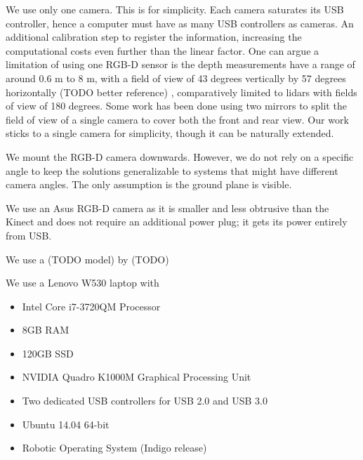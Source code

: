 We use only one camera. This is for simplicity. Each camera saturates its USB
controller, hence a computer must have as many USB controllers as cameras.
An additional calibration step to register the information, increasing the
computational costs even further than the linear factor. 
One can argue a limitation of using one RGB-D sensor is the depth measurements
have a range of around 0.6 m to 8 m, with a field of view of 43 degrees
vertically by 57 degrees horizontally (TODO better reference) \cite{endres2014catadioptric},
comparatively limited to lidars with fields of view of 180 degrees. Some work
\cite{endres2014catadioptric} has been done using two mirrors to split the field
of view of a single camera to cover both the front and rear view. Our work
sticks to a single camera for simplicity, though it can be naturally extended.

We mount the RGB-D camera downwards. However, we do not rely on a specific angle
to keep the solutions generalizable to systems that might have different camera
angles. The only assumption is the ground plane is visible.

We use an Asus RGB-D camera as it is smaller and less obtrusive than the Kinect
and does not require an additional power plug; it gets its power entirely from
USB.


We use a (TODO model) by (TODO) 

We use a Lenovo W530 laptop with 
\begin{itemize}
\item Intel Core i7-3720QM Processor
\item 8GB RAM
\item 120GB SSD
\item NVIDIA Quadro K1000M Graphical Processing Unit
\item Two dedicated USB controllers for USB 2.0 and USB 3.0
\item Ubuntu 14.04 64-bit
\item Robotic Operating System (Indigo release)
\end{itemize}

\endinput
Any text after an \endinput is ignored.
\section{Robotics Pipelines}

